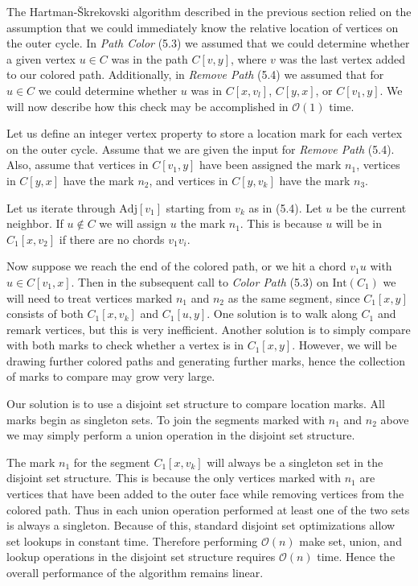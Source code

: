 \documentclass[letterpaper, 12pt]{article}
\theoremstyle{thm}
\begin{document}
The Hartman-\v{S}krekovski algorithm described in the previous section relied on the
assumption that we could immediately
know the relative location of vertices on the outer cycle. In
\textit{Path Color} (5.3) we assumed that we could determine
whether a given vertex $u\in C$ was in the path $C[v,y]$, where $v$ was the
last vertex added to our colored path. Additionally, in \textit{Remove Path}
(5.4) we assumed that for $u\in C$ we could determine whether $u$ was in $C[x,v_l]$,
$C[y,x]$, or $C[v_1,y]$. We will now describe how this check may be accomplished
in $\mathcal{O}(1)$ time.

Let us define an integer vertex property to store a location mark for each
vertex on the outer cycle. Assume that we are given the input for \textit{Remove
Path} (5.4). Also, assume that vertices in $C[v_1,y]$ have been assigned the mark $n_1$,
vertices in $C[y,x]$ have the mark $n_2$, and vertices in $C[y,v_k]$ have
the mark $n_3$.

Let us iterate through $\text{Adj}[v_1]$ starting from $v_k$ as in (5.4). Let
$u$ be the current neighbor. If $u\not\in C$ we will assign $u$ the mark $n_1$.
This is because $u$ will be in $C_1[x,v_2]$ if there are no chords $v_1v_i$.

Now suppose we reach the end of the colored path, or we hit a chord $v_1u$ with
$u\in C[v_1,x]$. Then in the subsequent call to \textit{Color Path} (5.3) on
$\text{Int}(C_1)$ we will need to treat vertices marked $n_1$ and $n_2$ as the
same segment, since $C_1[x,y]$ consists of both $C_1[x,v_k]$ and $C_1[u,y]$.
One solution is to walk along $C_1$ and remark vertices, but this is very
inefficient. Another solution is to simply compare with both marks to check
whether a vertex is in $C_1[x,y]$. However, we will be drawing further colored
paths and generating further marks, hence the collection of marks to compare
may grow very large.

Our solution is to use a disjoint set structure to compare location marks. All
marks begin as singleton sets. To join the segments marked with $n_1$ and
$n_2$ above we may simply perform a union operation in the disjoint set structure.

The mark $n_1$ for the segment $C_1[x,v_k]$ will always be a singleton set in the
disjoint set structure. This is because the only vertices marked with $n_1$ are
vertices that have been added to the outer face while removing vertices from the
colored path. Thus in each union operation performed at least one of the two sets
is always a singleton. Because of this, standard disjoint set optimizations
allow set lookups in constant time. Therefore performing
$\mathcal{O}(n)$ make set, union, and lookup operations in the disjoint set
structure requires $\mathcal{O}(n)$ time. Hence the overall performance of the
algorithm remains linear.
\end{document}
